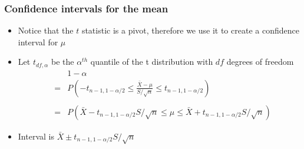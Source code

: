 \documentclass[10pt,portrait]{beamer}
\begin{document}

\begin{frame}\frametitle{Confidence intervals for the mean}
\begin{itemize}
\item Notice that the $t$ statistic is a pivot, therefore we use it
  to create a confidence interval for $\mu$
\item Let $t_{df,\alpha}$ be the $\alpha^{th}$ quantile of the t distribution with
  $df$ degrees of freedom
  \begin{eqnarray*}
&   & 1 - \alpha \\
& = & P\left(-t_{n-1,1-\alpha/2} \leq \frac{\bar X - \mu}{S/\sqrt{n}} \leq t_{n-1,1-\alpha/2}\right) \\ \\
& = & P\left(\bar X - t_{n-1,1-\alpha/2} S / \sqrt{n} \leq \mu  
      \leq \bar X + t_{n-1,1-\alpha/2}S /\sqrt{n}\right)
  \end{eqnarray*}
\item Interval is $\bar X \pm t_{n-1,1-\alpha/2} S/\sqrt{n}$
\end{itemize}
\end{frame}
% 
% 
\end{document}
